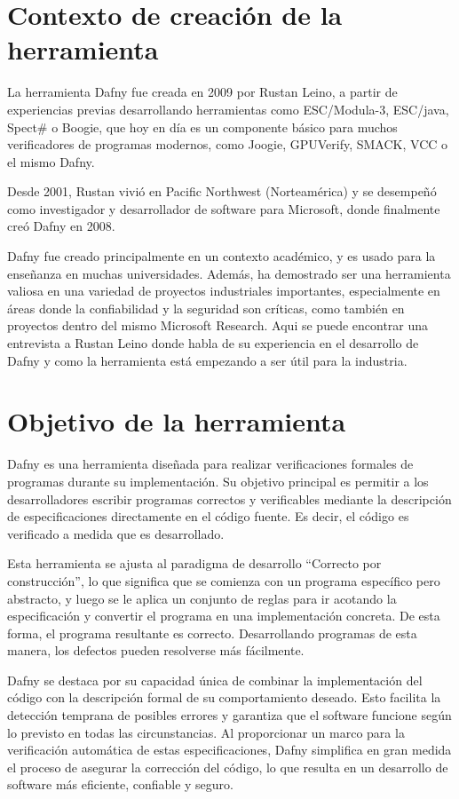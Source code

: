 \documentclass[runningheads]{llncs}
\begin{document}
\section{Contexto de creación de la herramienta}

La herramienta Dafny fue creada en 2009 por Rustan Leino,
a partir de experiencias previas desarrollando herramientas como ESC/Modula-3, ESC/java, Spect\# o Boogie,
que hoy en día es un componente básico para muchos verificadores de programas modernos,
como Joogie, GPUVerify, SMACK, VCC o el mismo Dafny.

Desde 2001, Rustan vivió en Pacific Northwest (Norteamérica) y se desempeñó como investigador y desarrollador de software para Microsoft,
donde finalmente creó Dafny en 2008.

Dafny fue creado principalmente en un contexto académico, 
y es usado para la enseñanza en muchas universidades.
Además, ha demostrado ser una herramienta valiosa en una variedad de proyectos industriales importantes, 
especialmente en áreas donde la confiabilidad y la seguridad son críticas, 
como también en proyectos dentro del mismo Microsoft Research.
Aqui\cite{EntrevistaLeino} se puede encontrar una entrevista a Rustan Leino donde habla de su experiencia en el desarrollo de Dafny y 
como la herramienta está empezando a ser útil para la industria.

\section{Objetivo de la herramienta}

Dafny es una herramienta diseñada para realizar verificaciones formales de programas durante su implementación.
Su objetivo principal es permitir a los desarrolladores escribir programas correctos y verificables mediante la descripción
de especificaciones directamente en el código fuente. Es decir, el código es verificado a medida que es desarrollado.

Esta herramienta se ajusta al paradigma de desarrollo ``Correcto por construcción'', lo que significa que se comienza
con un programa específico pero abstracto, y luego se le aplica un conjunto de reglas para ir acotando la especificación
y convertir el programa en una implementación concreta. De esta forma, el programa resultante es correcto.
Desarrollando programas de esta manera, los defectos pueden resolverse más fácilmente.

Dafny se destaca por su capacidad única de combinar la implementación del código con la descripción formal de su comportamiento
deseado. Esto facilita la detección temprana de posibles errores y garantiza que el software funcione según lo previsto en todas
las circunstancias. Al proporcionar un marco para la verificación automática de estas especificaciones, Dafny simplifica en gran
medida el proceso de asegurar la corrección del código, lo que resulta en un desarrollo de software más eficiente, confiable y seguro.
\end{document}
